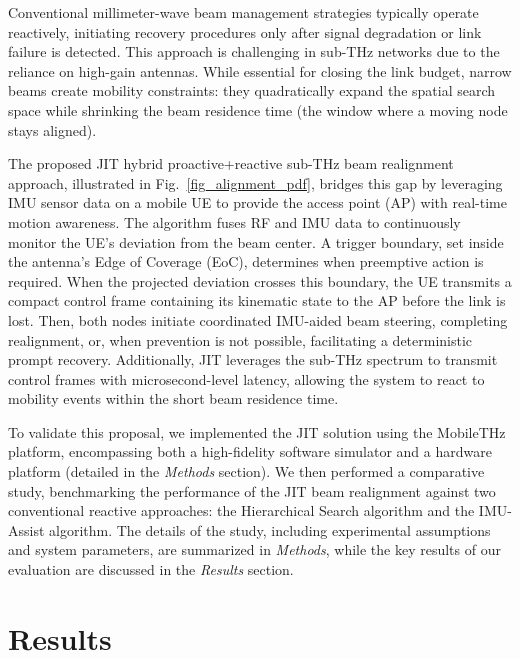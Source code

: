 \documentclass[fleqn,10pt]{wlscirep}
\begin{document}
Conventional millimeter-wave beam management strategies typically operate reactively, initiating recovery procedures only after signal degradation or link failure is detected\cite{Giordani2018ATO, Wang2022}. This approach is challenging in sub-THz networks due to the reliance on high-gain antennas\cite{Kleine-Ostmann2011}. While essential for closing the link budget, narrow beams create mobility constraints: they quadratically expand the spatial search space while shrinking the beam residence time (the window where a moving node stays aligned).

The proposed JIT hybrid proactive+reactive sub-THz beam realignment approach, illustrated in Fig.~\ref{fig_alignment_pdf}, bridges this gap by leveraging IMU sensor data on a mobile UE to provide the access point (AP) with real-time motion awareness. The algorithm fuses RF and IMU data to continuously monitor the UE's deviation from the beam center. A trigger boundary, set inside the antenna's Edge of Coverage (EoC), determines when preemptive action is required. When the projected deviation crosses this boundary, the UE transmits a compact control frame containing its kinematic state to the AP before the link is lost. Then, both nodes initiate coordinated IMU-aided beam steering, completing realignment, or, when prevention is not possible, facilitating a deterministic prompt recovery. Additionally, JIT leverages the sub-THz spectrum to transmit control frames with microsecond-level latency, allowing the system to react to mobility events within the short beam residence time.

To validate this proposal, we implemented the JIT solution using the MobileTHz platform, encompassing both a high-fidelity software simulator and a hardware platform (detailed in the \textit{Methods} section). We then performed a comparative study, benchmarking the performance of the JIT beam realignment against two conventional reactive approaches: the Hierarchical Search algorithm and the IMU-Assist algorithm. The details of the study, including experimental assumptions and system parameters, are summarized in \textit{Methods}, while the key results of our evaluation are discussed in the \textit{Results} section.






\section*{Results}
\end{document}
